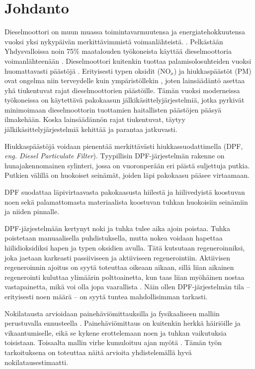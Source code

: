 \chapter{Johdanto}%
\label{ch:johdanto}
Dieselmoottori on muun muassa toimintavarmuutensa ja energiatehokkuutensa vuoksi yksi nykypäivän merkittävimmistä voimanlähteistä.  
\cite[s. 121, 137-138]{Koten_2024}.
Pelkästään Yhdysvalloissa noin 75\% maatalouden työkoneista käyttää dieselmoottoria voimanlähteenään \cite[s. 122]{Koten_2024}.  
Dieselmoottori kuitenkin tuottaa palamisolosuhteiden vuoksi
huomattavasti päästöjä \cite{FiebigMichael2014Pefd}. Erityisesti typen oksidit (NO\(_x\)) ja hiukkaspäästöt (PM) ovat ongelma niin terveydelle kuin ympäristöllekin \cite{YaoDongwei2023Rodm}\cite[s. 138]{Koten_2024}, joten  lainsäädäntö asettaa yhä tiukentuvat rajat dieselmoottorien päästöille. Tämän vuoksi moderneissa työkoneissa on käytettävä pakokaasun jälkikäsittelyjärjestelmiä, jotka pyrkivät minimoimaan dieselmoottorin tuottamien haitallisten päästöjen pääsyä ilmakehään. Koska lainsäädännön rajat tiukentuvat, täytyy jälkikäsittelyjärjestelmiä kehittää ja parantaa jatkuvasti.

Hiukkaspäästöjä voidaan pienentää merkittävästi hiukkassuodattimella (DPF, \emph{eng. Diesel Particulate Filter}).
Tyypillisin \cite{SHIYunxi2020Eota} DPF-järjestelmän rakenne on hunajakennomainen sylinteri, jossa on vuoronperään eri päistä suljettuja putkia. Putkien välillä on huokoiset seinämät, joiden läpi pakokaasu pääsee virtaamaan.

DPF suodattaa läpivirtaavasta pakokaasusta hiilestä ja hiilivedyistä koostuvan noen sekä palamattomasta materiaalista koostuvan tuhkan huokoisiin seinämiin ja niiden pinnalle. 

DPF-järjestelmään kertynyt noki ja tuhka tulee aika ajoin poistaa. Tuhka poistetaan manuaalisella puhdistuksella, mutta nokea voidaan hapettaa hiilidioksidiksi hapen ja typen oksidien avulla. Tätä kutsutaan regeneroinniksi, joka jaetaan karkeasti passiiviseen ja aktiiviseen regenerointiin.
Aktiivisen regeneroinnin ajoitus on syytä toteuttaa oikeaan aikaan, sillä liian aikainen regenerointi kuluttaa ylimäärin polttoainetta, kun taas liian myöhäinen nostaa vastapainetta, mikä voi olla jopa vaarallista \cite{YaoDongwei2023Rodm}. 
Näin ollen DPF-järjestelmän tila -- erityisesti noen  määrä -- on syytä tuntea mahdollisimman tarkasti. 

Nokilatausta arvioidaan painehäviömittauksilla ja fysikaaliseen malliin perustuvalla ennusteella \cite{YaoDongwei2023Rodm}. Painehäviömittaus on kuitenkin herkkä häiriöille ja vikaantumiselle, eikä se kykene erottelemaan noen ja tuhkan vaikutuksia toisistaan.
Toisaalta mallin virhe kumuloituu ajan myötä \cite{YaoDongwei2023Rodm}.
Tämän työn tarkoituksena on toteuttaa näitä arvioita yhdistelemällä hyvä nokilatausestimaatti. 

